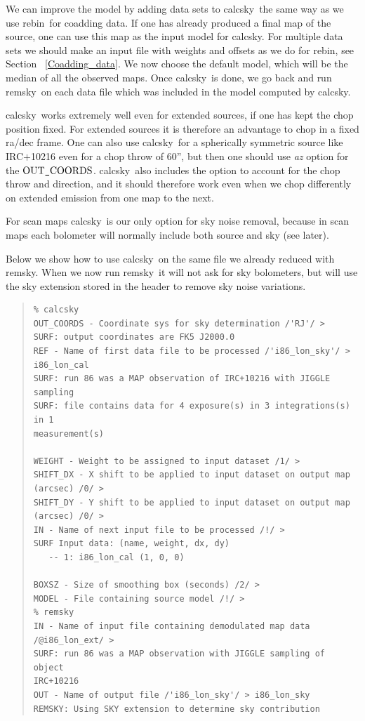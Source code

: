 \documentclass[twoside,11pt]{article}
\newenvironment{myquote}{\begin{quote}\begin{small}}{\end{small}\end{quote}}
\newcommand{\task}[1]{\textsf{#1}}
\newcommand{\rebin}{\xref{\task{rebin}}{sun216}{REBIN}}
\newcommand{\calcsky}{\xref{\task{calcsky}}{sun216}{CALCSKY}}
\newcommand{\remsky}{\xref{\task{remsky}}{sun216}{REMSKY}}
\newcommand{\xref}[3]{#1}
\renewcommand{\_}{\texttt{\symbol{95}}}
\begin{document}
We can improve the model by adding data sets to \calcsky\ the same way
as we use \rebin\ for coadding data.  If one has already produced a
final map of the source, one can use this map as the input model for
\calcsky.  For multiple data sets we should make an input file with
weights and offsets as we do for \rebin, see Section \
\ref{Coadding_data}. We now choose the default model, which will be
the median of all the observed maps.  Once \calcsky\ is done, we go
back and run \remsky\ on each data file which was included in the model
computed by \calcsky.

\calcsky\ works extremely well even for extended sources, if one has
kept the chop position fixed. For extended sources it is therefore an
advantage to chop in a fixed ra/dec frame. One can also use \calcsky\
for a spherically symmetric source like IRC$+$10216 even for a chop
throw of 60'', but then one should use {\it az} option for the $\rm
OUT\_COORDS$.  \calcsky\ also includes the option to account for the
chop throw and direction, and it should therefore work even when we
chop differently on extended emission from one map to the next.



For scan maps \calcsky\ is our only option for sky noise removal,
because in scan maps each bolometer will normally include both source
and sky (see later).

Below we show how to use \calcsky\ on the same file we already reduced
with \remsky. When we now run \remsky\ it will not ask for sky
bolometers, but will use the sky extension stored in the header to
remove sky noise variations.


\begin{myquote}
\begin{verbatim}
% calcsky
OUT_COORDS - Coordinate sys for sky determination /'RJ'/ >
SURF: output coordinates are FK5 J2000.0
REF - Name of first data file to be processed /'i86_lon_sky'/ >
i86_lon_cal
SURF: run 86 was a MAP observation of IRC+10216 with JIGGLE sampling
SURF: file contains data for 4 exposure(s) in 3 integrations(s) in 1
measurement(s)

WEIGHT - Weight to be assigned to input dataset /1/ >
SHIFT_DX - X shift to be applied to input dataset on output map
(arcsec) /0/ >
SHIFT_DY - Y shift to be applied to input dataset on output map
(arcsec) /0/ >
IN - Name of next input file to be processed /!/ >
SURF Input data: (name, weight, dx, dy)
   -- 1: i86_lon_cal (1, 0, 0)

BOXSZ - Size of smoothing box (seconds) /2/ >
MODEL - File containing source model /!/ >
% remsky
IN - Name of input file containing demodulated map data
/@i86_lon_ext/ >
SURF: run 86 was a MAP observation with JIGGLE sampling of object
IRC+10216
OUT - Name of output file /'i86_lon_sky'/ > i86_lon_sky
REMSKY: Using SKY extension to determine sky contribution
\end{verbatim}
\end{myquote}
\end{document}
